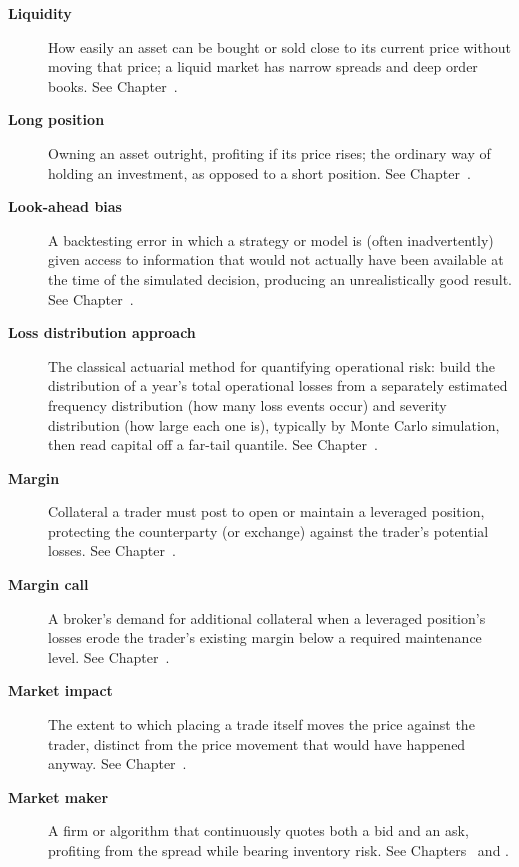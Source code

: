 \documentclass[../ai_in_finance]{subfiles}
\begin{document}
\begin{description}
\item[\textbf{Liquidity}] How easily an asset can be bought or sold close to its current price without moving that price; a liquid market has narrow spreads and deep order books. See Chapter~.

\item[\textbf{Long position}] Owning an asset outright, profiting if its price rises; the ordinary way of holding an investment, as opposed to a short position. See Chapter~.

\item[\textbf{Look-ahead bias}] A backtesting error in which a strategy or model is (often inadvertently) given access to information that would not actually have been available at the time of the simulated decision, producing an unrealistically good result. See Chapter~.

\item[\textbf{Loss distribution approach}] The classical actuarial method for quantifying operational risk: build the distribution of a year's total operational losses from a separately estimated frequency distribution (how many loss events occur) and severity distribution (how large each one is), typically by Monte Carlo simulation, then read capital off a far-tail quantile. See Chapter~.

\item[\textbf{Margin}] Collateral a trader must post to open or maintain a leveraged position, protecting the counterparty (or exchange) against the trader's potential losses. See Chapter~.

\item[\textbf{Margin call}] A broker's demand for additional collateral when a leveraged position's losses erode the trader's existing margin below a required maintenance level. See Chapter~.

\item[\textbf{Market impact}] The extent to which placing a trade itself moves the price against the trader, distinct from the price movement that would have happened anyway. See Chapter~.

\item[\textbf{Market maker}] A firm or algorithm that continuously quotes both a bid and an ask, profiting from the spread while bearing inventory risk. See Chapters~ and .


\end{description}
\end{document}
